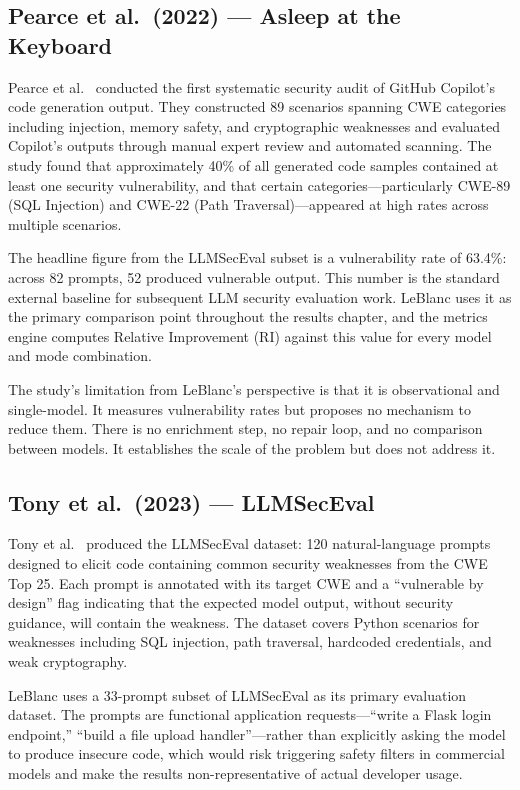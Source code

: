 \documentclass[12pt,a4paper]{report}
\begin{document}
\subsection{Pearce et al.\ (2022) --- Asleep at the Keyboard}
\label{ssec:pearce}

Pearce et al.~\cite{pearce2022asleep} conducted the first systematic security
audit of GitHub Copilot's code generation output. They constructed 89 scenarios
spanning CWE categories including injection, memory safety, and cryptographic
weaknesses and evaluated Copilot's outputs through manual expert review and
automated scanning. The study found that approximately 40\% of all generated
code samples contained at least one security vulnerability, and that certain
categories---particularly CWE-89 (SQL Injection) and CWE-22 (Path
Traversal)---appeared at high rates across multiple scenarios.

The headline figure from the LLMSecEval subset is a vulnerability rate of 63.4\%:
across 82 prompts, 52 produced vulnerable output. This number is the standard
external baseline for subsequent LLM security evaluation work. LeBlanc uses it
as the primary comparison point throughout the results chapter, and the
metrics engine computes Relative Improvement (RI) against this value for every
model and mode combination.

The study's limitation from LeBlanc's perspective is that it is observational
and single-model. It measures vulnerability rates but proposes no mechanism to
reduce them. There is no enrichment step, no repair loop, and no comparison
between models. It establishes the scale of the problem but does not address it.

\subsection{Tony et al.\ (2023) --- LLMSecEval}
\label{ssec:tony}

Tony et al.~\cite{tony2023llmseceval} produced the LLMSecEval dataset: 120
natural-language prompts designed to elicit code containing common security
weaknesses from the CWE Top 25. Each prompt is annotated with its target CWE
and a ``vulnerable by design'' flag indicating that the expected model output,
without security guidance, will contain the weakness. The dataset covers Python
scenarios for weaknesses including SQL injection, path traversal, hardcoded
credentials, and weak cryptography.

LeBlanc uses a 33-prompt subset of LLMSecEval as its primary evaluation dataset.
The prompts are functional application requests---``write a Flask login
endpoint,'' ``build a file upload handler''---rather than explicitly asking the
model to produce insecure code, which would risk triggering safety filters in
commercial models and make the results non-representative of actual developer
usage.
\end{document}
